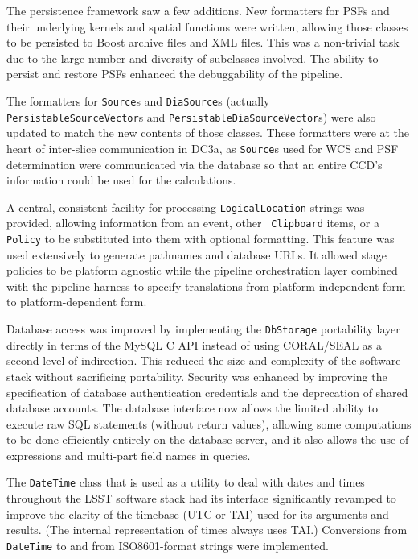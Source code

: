 The persistence framework saw a few additions.  New formatters for PSFs
and their underlying kernels and spatial functions were written,
allowing those classes to be persisted to Boost archive files and XML
files.  This was a non-trivial task due to the large number and
diversity of subclasses involved.  The ability to persist and restore
PSFs enhanced the debuggability of the pipeline.

The formatters for {\tt Source}s and {\tt DiaSource}s (actually {\tt
PersistableSourceVector}s and 
\hfil\break\texttt{PersistableDiaSourceVector}s) were also updated 
to match the new contents of those classes.  These formatters were at
the heart of inter-slice communication in DC3a, as {\tt Source}s used
for WCS and PSF determination were communicated via the database so
that an entire CCD's information could be used for the calculations.

A central, consistent facility for processing {\tt LogicalLocation}
strings was provided, allowing information from an event, other {\tt
Clipboard} items, or a {\tt Policy} to be substituted into them with
optional formatting.  This feature was used extensively to generate
pathnames and database URLs.  It allowed stage policies to be
platform agnostic while the pipeline orchestration layer combined
with the pipeline harness to specify translations from
platform-independent form to platform-dependent form.

Database access was improved by implementing the {\tt DbStorage}
portability layer directly in terms of the MySQL C API instead of using
CORAL/SEAL as a second level of indirection.  This reduced the size and
complexity of the software stack without sacrificing portability.
Security was enhanced by improving the specification of database
authentication credentials and the deprecation of shared database
accounts.  The database interface now allows the limited ability to
execute raw SQL statements (without return values), allowing some
computations to be done efficiently entirely on the database server, and
it also allows the use of expressions and multi-part field names in
queries.

The {\tt DateTime} class that is used as a utility to deal with dates and
times throughout the LSST software stack had its interface significantly
revamped to improve the clarity of the timebase (UTC or TAI) used for
its arguments and results.  (The internal representation of times always
uses TAI.)  Conversions from {\tt DateTime} to and from ISO8601-format
strings were implemented.

